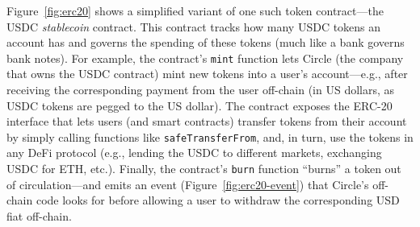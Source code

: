 Figure~\ref{fig:erc20} shows a simplified variant of one such token
contract---the USDC \emph{stablecoin} contract.  This contract tracks
how many USDC tokens an account has and governs the spending of these
tokens (much like a bank governs bank notes).  For example, the
contract's \texttt{mint} function lets Circle (the company that owns
the USDC contract) mint new tokens into a user's account---e.g., after
receiving the corresponding payment from the user off-chain (in US
dollars, as USDC tokens are pegged to the US dollar).  The contract
exposes the ERC-20 interface that lets users (and smart contracts)
transfer tokens from their account by simply calling functions like
\texttt{safeTransferFrom}, and, in turn, use the tokens in any DeFi
protocol (e.g., lending the USDC to different markets, exchanging USDC
for ETH,
etc.). Finally, the contract's
\texttt{burn} function ``burns'' a token out of circulation---and
emits an event (Figure~\ref{fig:erc20-event}) that Circle's off-chain code looks for before allowing
a user to withdraw the corresponding USD fiat off-chain.




